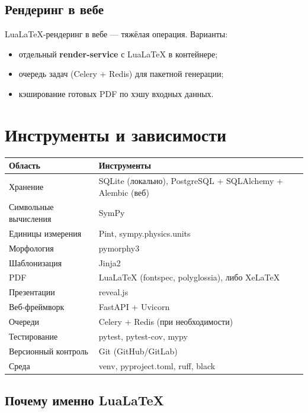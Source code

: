 \documentclass[12pt,a4paper]{article}
\begin{document}
\subsection{Рендеринг в вебе}

LuaLaTeX-рендеринг в вебе --- тяжёлая операция. Варианты:
\begin{itemize}
    \item отдельный \textbf{render-service} с LuaLaTeX в контейнере;
    \item очередь задач (Celery + Redis) для пакетной генерации;
    \item кэширование готовых PDF по хэшу входных данных.
\end{itemize}

\section{Инструменты и зависимости}

\begin{center}
\begin{tabular}{@{}p{4cm}p{9.5cm}@{}}
\toprule
\textbf{Область} & \textbf{Инструменты} \\
\midrule
Хранение & SQLite (локально), PostgreSQL + SQLAlchemy + Alembic (веб) \\
Символьные вычисления & SymPy \\
Единицы измерения & Pint, sympy.physics.units \\
Морфология & pymorphy3 \\
Шаблонизация & Jinja2 \\
PDF & LuaLaTeX (fontspec, polyglossia), либо XeLaTeX \\
Презентации & reveal.js \\
Веб-фреймворк & FastAPI + Uvicorn \\
Очереди & Celery + Redis (при необходимости) \\
Тестирование & pytest, pytest-cov, mypy \\
Версионный контроль & Git (GitHub/GitLab) \\
Среда & venv, pyproject.toml, ruff, black \\
\bottomrule
\end{tabular}
\end{center}

\subsection{Почему именно LuaLaTeX}
\end{document}
